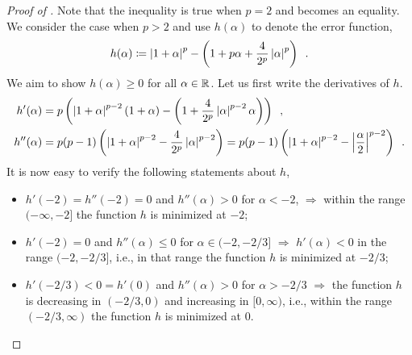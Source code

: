 \begin{proof}[Proof of ]
Note that the inequality is true when $p=2$ and becomes an equality. We consider the case when $p>2$ and use $h(\alpha)$ to denote the error function,
\begin{align*}
    h(\alpha) \coloneqq \left\lvert 1+\alpha \right\rvert^p - \left(1+p\alpha+\frac{4}{2^p}\left\lvert \alpha \right\rvert^p\right)\enspace.
\end{align*}
We aim to show $h(\alpha) \ge 0$ for all $\alpha \in \mathbb{R}$. Let us first write the derivatives of $h$.
\begin{align*}
    h'(\alpha) &= p\left(\left\lvert 1+\alpha \right\rvert^{p-2}(1+\alpha) - \left(1 + \frac{4}{2^p}\left\lvert \alpha \right\rvert^{p-2}\alpha\right)\right)\enspace,\\
    h''(\alpha) &= p(p-1)\left(\left\lvert 1+\alpha \right\rvert^{p-2}-\frac{4}{2^p}\left\lvert \alpha \right\rvert^{p-2}\right) = p(p-1)\left(\left\lvert 1+\alpha \right\rvert^{p-2}-\left\lvert \frac{\alpha}{2} \right\rvert^{p-2}\right)\enspace.
\end{align*}
It is now easy to verify the following statements about $h$,
\begin{itemize}
    \item[I.] $h'(-2) = h''(-2) = 0$ and $h''(\alpha) > 0$ for $\alpha < -2$, $\Rightarrow$ within the range $(-\infty,-2]$ the function $h$ is minimized at $-2$;
    \item[II.] $h'(-2)=0$ and $h''(\alpha) \leq 0$ for $\alpha\in (-2, -2/3]$ $\Rightarrow$ $h'(\alpha) < 0$ in the range $(-2, -2/3]$, i.e., in that range the function $h$ is minimized at $-2/3$;
    \item[III.] $h'(-2/3) < 0 = h'(0)$ and $h''(\alpha) > 0$ for $\alpha > -2/3$ $\Rightarrow$ the function $h$ is decreasing in $(-2/3,0)$ and increasing in $[0, \infty)$, i.e., within the range $(-2/3, \infty)$ the function $h$ is minimized at $0$.

\end{itemize}
\end{proof}
